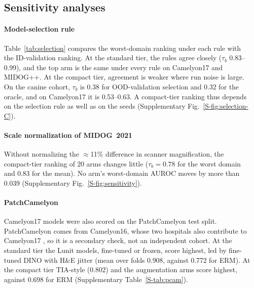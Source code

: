 \subsection{Sensitivity analyses}
\label{sec:results-sensitivity}

\paragraph{Model-selection rule} Table~\ref{tab:selection} compares the
worst-domain ranking under each rule with the ID-validation ranking. At the
standard tier, the rules agree closely ($\tau_b$ 0.83--0.99), and the top arm
is the same under every rule on Camelyon17 and MIDOG++. At the compact tier,
agreement is weaker where run noise is large. On the canine cohort,
$\tau_b$ is 0.38 for OOD-validation selection and 0.32 for the oracle, and on
Camelyon17 it is 0.53--0.63. A compact-tier ranking thus depends on the
selection rule as well as on the seeds (Supplementary Fig.~\ref{S-fig:selection-C}).

\begin{table}[width=\linewidth,pos=t]
\caption{Agreement between model-selection rules: Kendall's $\tau_b$ between
the worst-domain ranking under each rule and the ranking under ID-validation
selection, over the arms analyzed under every rule (TTA pseudo-arms are
evaluated only under ID-validation selection). MIDOG~2021 has no OOD-validation
domain. Same top arm: whether every rule puts the same arm first.}
\label{tab:selection}
\footnotesize

\end{table}

\paragraph{Scale normalization of MIDOG~2021} Without normalizing the
$\approx$11\% difference in scanner magnification, the compact-tier ranking of
20 arms changes little ($\tau_b=0.78$ for the worst domain and 0.83 for the
mean). No arm's worst-domain AUROC moves by more than 0.039 (Supplementary
Fig.~\ref{S-fig:sensitivity}).

\paragraph{PatchCamelyon} Camelyon17 models were also scored on the
PatchCamelyon test split. PatchCamelyon comes from Camelyon16, whose two
hospitals also contribute to Camelyon17
\citep{veeling2018pcam,litjens2018camelyon}, so it is a secondary check, not an
independent cohort. At the standard tier the Lunit models,
fine-tuned or frozen, score highest, led by fine-tuned DINO with H\&E jitter
(mean over folds 0.908, against 0.772 for ERM). At the compact tier TIA-style
(0.802) and the augmentation arms score highest, against 0.698 for ERM
(Supplementary Table~\ref{S-tab:pcam}).

